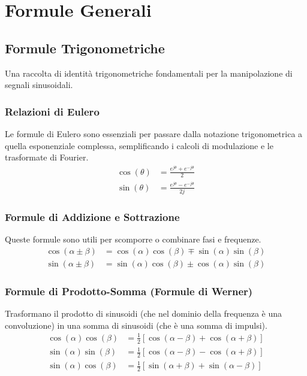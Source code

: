 \chapter*{Formule Generali}

\section{Formule Trigonometriche}
Una raccolta di identità trigonometriche fondamentali per la manipolazione di segnali sinusoidali.

\subsection{Relazioni di Eulero}
Le formule di Eulero sono essenziali per passare dalla notazione trigonometrica a quella esponenziale complessa, semplificando i calcoli di modulazione e le trasformate di Fourier.
\begin{align*}
    \cos(\theta) &= \frac{e^{j\theta} + e^{-j\theta}}{2} \\
    \sin(\theta) &= \frac{e^{j\theta} - e^{-j\theta}}{2j}
\end{align*}

\subsection{Formule di Addizione e Sottrazione}
Queste formule sono utili per scomporre o combinare fasi e frequenze.
\begin{align*}
    \cos(\alpha \pm \beta) &= \cos(\alpha)\cos(\beta) \mp \sin(\alpha)\sin(\beta) \\
    \sin(\alpha \pm \beta) &= \sin(\alpha)\cos(\beta) \pm \cos(\alpha)\sin(\beta)
\end{align*}

\subsection{Formule di Prodotto-Somma (Formule di Werner)}
Trasformano il prodotto di sinusoidi (che nel dominio della frequenza è una convoluzione) in una somma di sinusoidi (che è una somma di impulsi).
\begin{align*}
    \cos(\alpha)\cos(\beta) &= \frac{1}{2}[\cos(\alpha - \beta) + \cos(\alpha + \beta)] \\
    \sin(\alpha)\sin(\beta) &= \frac{1}{2}[\cos(\alpha - \beta) - \cos(\alpha + \beta)] \\
    \sin(\alpha)\cos(\beta) &= \frac{1}{2}[\sin(\alpha + \beta) + \sin(\alpha - \beta)]
\end{align*}

